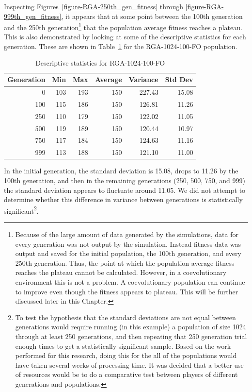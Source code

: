 Inspecting Figures~\ref{figure-RGA-250th_gen_fitness} through
\ref{figure-RGA-999th_gen_fitness}, it appears that at some point between the
100th generation and the 250th generation\footnote{Because of the large amount
of data generated by the simulations, data for every generation was not output
by the simulation. Instead fitness data was output and saved for the initial
population, the 100th generation, and every 250th generation. Thus, the point at
which the population average fitness reaches the plateau cannot be calculated.
However, in a coevolutionary environment this is not a problem. A coevolutionary
population can continue to improve even though the fitness appears to plateau.
This will be further discussed later in this Chapter.} that the population
average fitness reaches a plateau. This is also demonstrated by looking at some
of the descriptive statistics for each generation. These are shown in
Table~\ref{table-stats-for-s1024-n100-fo} for the RGA-1024-100-FO population.

\begin{table}[ht]
\begin{center}
\caption[RGA-1024-100-FO statistics]{Descriptive statistics for RGA-1024-100-FO}
\begin{tabular}{ | r || r | r | r | r | r |}
\hline                        
Generation & Min & Max & Average & Variance & Std Dev \\ \hline \hline
0   & 103 & 193 & 150 & 227.43 & 15.08 \\ \hline
100 & 115 & 186 & 150 & 126.81 & 11.26 \\ \hline 
250 & 110 & 179 & 150 & 122.02 & 11.05 \\ \hline
500 & 119 & 189 & 150 & 120.44 & 10.97 \\ \hline
750 & 117 & 184 & 150 & 124.63 & 11.16 \\ \hline
999 & 113 & 188 & 150 & 121.10 & 11.00 \\ \hline
\end{tabular}
\label{table-stats-for-s1024-n100-fo}
\end{center}
\end{table}

In the initial generation, the standard deviation is 15.08, drops to 11.26 by
the 100th generation, and then in the remaining generations (250, 500, 750, and
999) the standard deviation appears to fluctuate around 11.05. We did not
attempt to determine whether this difference in variance between generations is
statistically significant\footnote{To test the hypothesis that the standard
deviations are not equal between generations would require running (in this
example) a population of size 1024 through at least 250 generations, and then
repeating that 250 generation trial enough times to get a statistically
significant sample. Based on the work performed for this research, doing this
for the all of the populations would have taken several weeks of processing
time. It was decided that a better use of resources would be to do a comparative
test between players of different generations and populations.}.

